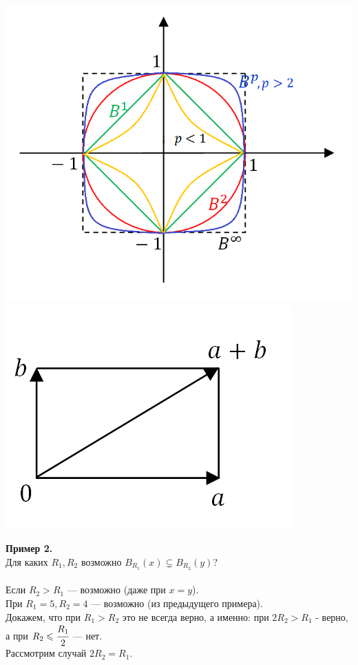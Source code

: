 \documentclass[a4paper,12pt]{article}
\begin{document}
\begin{defintion}
\begin{center}
	\includegraphics[scale=0.7]{l4_11.png}
	\includegraphics[scale=0.5]{l4_12.png}
\end{center}
\textbf{Пример 2.}\\
Для каких $R_1, R_2$ возможно $B_{R_1}(x) \subsetneq B_{R_2}(y)$?\\
\\
Если $R_2 > R_1$ --- возможно (даже при $x = y$).\\
При $R_1 = 5, R_2 = 4$ --- возможно (из предыдущего примера).\\
Докажем, что при $R_1 > R_2$ это не всегда верно, а именно: при $2R_2 > R_1$ - верно, а при $R_2 \leqslant \cfrac{R_1}{2}$ --- нет.\\
Рассмотрим случай $2R_2 = R_1$. \begin{center}

\end{center}
\end{defintion}
\end{document}
